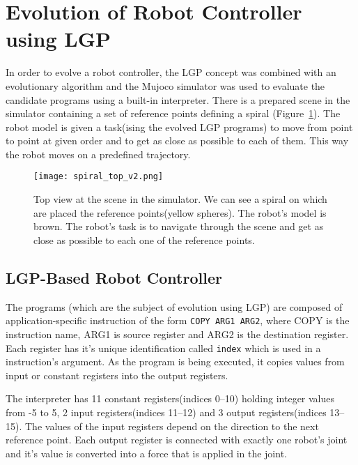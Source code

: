 \documentclass{ExcelAtFIT}
\begin{document}

\section{Evolution of Robot Controller using LGP}
\label{sec:ExperimentsSetup}
In order to evolve a robot controller, the LGP concept was combined with an evolutionary algorithm and the Mujoco simulator\cite{Todorov2012} was used to evaluate the candidate programs using a built-in interpreter.
There is a prepared scene in the simulator containing a set of reference points defining a spiral (Figure~\ref{fig:SpiralTop}).
The robot model is given a task(ising the evolved LGP programs) to move from point to point at given order and to get as close as possible to each of them.
This way the robot moves on a predefined trajectory.

\begin{figure}[t]
\centering
{\texttt{[image: spiral\_top\_v2.png]}}
\caption{Top view at the scene in the simulator.
We can see a spiral on which are placed the reference points(yellow spheres).
The robot's model is brown.
The robot's task is to navigate through the scene and get as close as possible to each one of the reference points.}
\label{fig:SpiralTop}
\end{figure}


\subsection{LGP-Based Robot Controller}
\label{subsec:lgp-basedRobotController}
The programs (which are the subject of evolution using LGP) are composed of application-specific instruction of the form \texttt{COPY ARG1 ARG2}, where COPY is the instruction name, ARG1 is source register and ARG2 is the destination register.
Each register has it's unique identification called \texttt{index} which is used in a instruction's argument.
As the program is being executed, it copies values from input or constant registers into the output registers.

The interpreter has 11 constant registers(indices 0–10) holding integer values from -5 to 5, 2 input registers(indices 11–12) and 3 output registers(indices 13–15).
The values of the input registers depend on the direction to the next reference point.
Each output register is connected with exactly one robot's joint and it's value is converted into a force that is applied in the joint.
\end{document}
